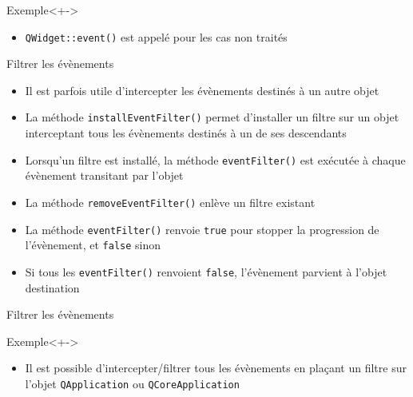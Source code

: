 \documentclass{beamer} %
\begin{document}
\begin{frame}
\begin{exampleblock}{Exemple}<+->
	
\end{exampleblock}

	\begin{itemize}
	 \item<+-> \texttt{QWidget::event()} est appelé pour les cas non traités
	\end{itemize}

\end{frame}


\begin{frame}{Filtrer les évènements}
	\begin{itemize}
	 \item<+-> Il est parfois utile d'intercepter les évènements destinés à un autre objet
	 \item<+-> La méthode \texttt{installEventFilter()} permet d'installer un filtre sur un objet interceptant tous les évènements destinés à un de ses descendants
	 \item<+-> Lorsqu'un filtre est installé, la méthode \texttt{eventFilter()} est exécutée à chaque évènement transitant par l'objet
	 \item<+-> La méthode \texttt{removeEventFilter()} enlève un filtre existant
	 \item<+-> La méthode \texttt{eventFilter()} renvoie \texttt{true} pour stopper la progression de l'évènement, et \texttt{false} sinon
	 \item<+-> Si tous les \texttt{eventFilter()} renvoient \texttt{false}, l'évènement parvient à l'objet destination
	\end{itemize}
\end{frame}

\begin{frame}{Filtrer les évènements}
	
\begin{exampleblock}{Exemple}<+->
	
\end{exampleblock}

	\begin{itemize}
	 \item<+-> Il est possible d'intercepter/filtrer tous les évènements en plaçant un filtre sur l'objet \texttt{QApplication} ou \texttt{QCoreApplication}
	\end{itemize}
\end{frame}
\end{document}
